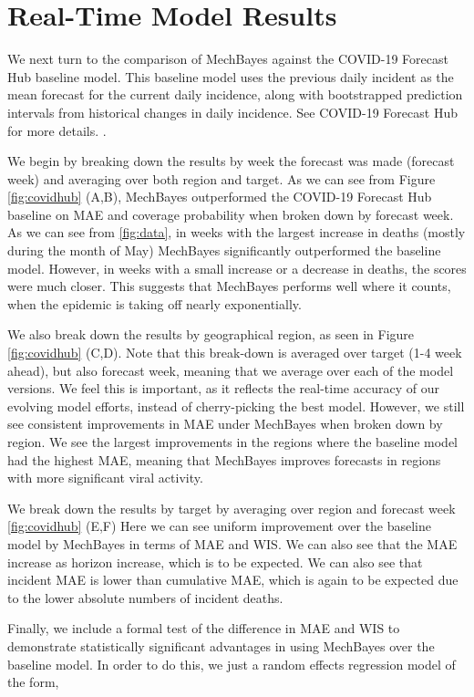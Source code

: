 \documentclass[11pt]{amsart}
\begin{document}
\section{Real-Time Model Results}

We next turn to the comparison of MechBayes against the COVID-19 Forecast Hub baseline model. This baseline model uses the previous daily incident as the mean forecast for the current daily incidence, along with  bootstrapped prediction intervals from historical changes in daily incidence. See COVID-19 Forecast Hub for more details. \cite{covidhub}. 

We begin by breaking down the results by week the forecast was made (forecast week) and averaging over both region and target. As we can see from Figure \ref{fig:covidhub} (A,B), MechBayes outperformed the COVID-19 Forecast Hub baseline on MAE and coverage probability when broken down by forecast week.  As we can see from \ref{fig:data}, in weeks with the largest increase in deaths (mostly during the month of May) MechBayes significantly outperformed the baseline model. However, in weeks with a small increase or a decrease in deaths, the scores were much closer. This suggests that MechBayes performs well where it counts, when the epidemic is taking off nearly exponentially. 

We also break down the results by geographical region, as seen in Figure \ref{fig:covidhub} (C,D). Note that this break-down is averaged over target (1-4 week ahead), but also forecast week, meaning that we average over each of the model versions. We feel this is important, as it reflects the real-time accuracy of our evolving model efforts, instead of cherry-picking the best model. However, we still see consistent improvements in MAE under MechBayes when broken down by region. We see the largest improvements in the regions where the baseline model had the highest MAE, meaning that MechBayes improves forecasts in regions with more significant viral activity. 

We break down the results by target by averaging over region and forecast week  \ref{fig:covidhub} (E,F) Here we can see uniform improvement over the baseline model by MechBayes in terms of MAE and WIS. We can also see that the MAE increase as horizon increase, which is to be expected. We can also see that incident MAE is lower than cumulative MAE, which is again to be expected due to the lower absolute numbers of incident deaths. 

Finally, we include a formal test of the difference in MAE and WIS to demonstrate statistically significant advantages in using MechBayes over the baseline model. In order to do this, we just a random effects regression model of the form,
\end{document}

